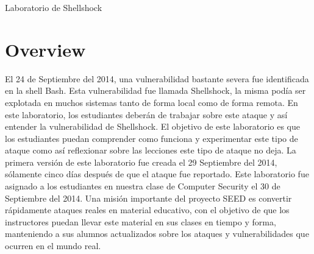
\newcommand{\commonfolder}{../../common-files}
\newcommand{\webcommon}{../Web_Common}





\newcommand{\bash}{{\tt bash}\xspace}
\newcommand{\Bash}{{\tt Bash}\xspace}




\begin{center}
{\LARGE Laboratorio de Shellshock}
\end{center}


\section{Overview}

El 24 de Septiembre del 2014, una vulnerabilidad bastante severa fue identificada en la shell Bash. Esta vulnerabilidad fue llamada Shellshock, la misma podía ser explotada en muchos sistemas tanto de forma local como de forma remota.
En este laboratorio, los estudiantes deberán de trabajar sobre este ataque y así entender la vulnerabilidad de Shellshock. 
El objetivo de este laboratorio es que los estudiantes puedan comprender como funciona y experimentar este tipo de ataque como así reflexionar sobre las lecciones este tipo de ataque no deja.
La primera versión de este laboratorio fue creada el 29 Septiembre del 2014, sólamente cinco días después de que el ataque fue reportado. Este laboratorio fue asignado a los estudiantes en nuestra clase de Computer Security el 30 de Septiembre del 2014.
Una misión importante del proyecto SEED es convertir rápidamente ataques reales en material educativo, con el objetivo de que los instructores puedan llevar este material en sus clases en tiempo y forma, manteniendo a sus alumnos actualizados sobre los ataques y vulnerabilidades que ocurren en el mundo real. 

